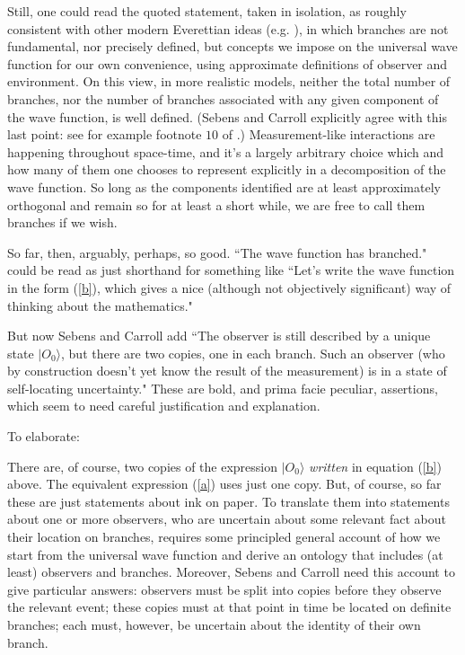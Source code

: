 \documentclass[aps,prl,12pt]{revtex4}
\def\ket#1{| #1\rangle}
\begin{document}
Still, one could read the quoted statement, taken in isolation,
as roughly consistent with other modern Everettian ideas 
(e.g. \cite{wallaceontology,wallace2012emergent}),
in which branches are not fundamental, nor precisely defined, but concepts
we impose on the universal wave function for our own convenience,
using approximate definitions of observer and environment.  
On this view, in more realistic models, neither 
the total number of branches, nor
the number of branches associated with any given component
of the wave function, is well defined.  
(Sebens and Carroll explicitly agree with this last
point: see for example footnote $10$ of \cite{cs1}.)
Measurement-like interactions are happening throughout space-time, and it's
a largely arbitrary choice which and how many of them one
chooses to represent explicitly in a decomposition of 
the wave function.   So long as 
the components identified are at least approximately 
orthogonal and remain so for at least a short while, we
are free to call them branches if we wish.

So far, then, arguably, perhaps, so good.   ``The wave function has
branched." could be read as just shorthand for something like ``Let's 
write the wave function in the form (\ref{b}), which gives a nice
(although not objectively significant) way of thinking about the
mathematics."  

But now Sebens and Carroll add ``The observer is still described
by a unique state $\ket{O_0}$, but there are two copies, one in
each branch.   Such an observer (who by construction doesn't
yet know the result of the measurement) is in a state of 
self-locating uncertainty."   
These are bold, and prima facie peculiar, assertions, which seem to need 
careful justification and explanation.  

To elaborate: 
   
There are, of course, two copies of the expression $\ket{O_0}$ 
{\it written} in equation (\ref{b}) above.   
The equivalent expression (\ref{a}) uses
just one copy.   
But, of course, so far these are just statements about ink on paper.  
To translate them into statements about one or more
observers, who are uncertain about
some relevant fact about their location on branches, 
requires some principled 
general account of how we 
start from the universal wave function and 
derive an ontology that includes
(at least) observers and branches. 
Moreover, Sebens and Carroll need 
this account to give particular answers: observers must be split
into copies before they
observe the relevant event; these copies must at that point in time be
located on definite branches; each must, however, be uncertain about 
the identity of their own branch. 
\end{document}
